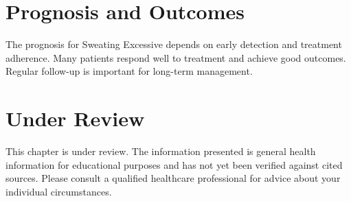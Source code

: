 \section*{Prognosis and Outcomes}
The prognosis for Sweating Excessive depends on early detection and treatment adherence. Many patients respond well to treatment and achieve good outcomes. Regular follow-up is important for long-term management.
\section*{Under Review}
This chapter is under review. The information presented is general health information for educational purposes and has not yet been verified against cited sources. Please consult a qualified healthcare professional for advice about your individual circumstances.


\clearpage
